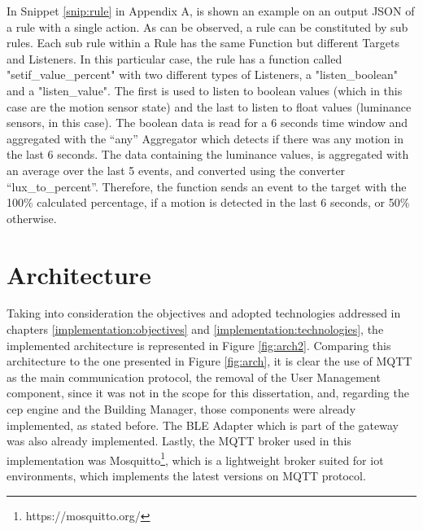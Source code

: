 In Snippet \ref{snip:rule} in Appendix A, is shown an example on an output JSON of a rule with a single action. As can be observed, a rule can be constituted by sub rules. Each sub rule within a Rule has the same Function but different Targets and Listeners. In this particular case, the rule has a function called "setif\_value\_percent" with two different types of Listeners, a "listen\_boolean" and a "listen\_value". The first is used to listen to boolean values (which in this case are the motion sensor state) and the last to listen to float values (luminance sensors, in this case). The boolean data is read for a 6 seconds time window and aggregated with the “any” Aggregator which detects if there was any motion in the last 6 seconds. The data containing the luminance values, is aggregated with an average over the last 5 events, and converted using the converter “lux\_to\_percent”. Therefore, the function sends an event to the target with the 100\% calculated percentage, if a motion is detected in the last 6 seconds, or 50\% otherwise. 





	
\section{Architecture}
\label{implementation:architecture}
Taking into consideration the objectives and adopted technologies addressed in chapters \ref{implementation:objectives} and \ref{implementation:technologies}, the implemented architecture is represented in Figure \ref{fig:arch2}. Comparing this architecture to the one presented in Figure \ref{fig:arch}, it is clear the use of MQTT as the main communication protocol, the removal of the User Management component, since it was not in the scope for this dissertation, and, regarding the \ac{cep} engine and the Building Manager, those components were already implemented, as stated before. The BLE Adapter which is part of the gateway was also already implemented. Lastly, the MQTT broker used in this implementation was Mosquitto\footnote{https://mosquitto.org/}, which is a lightweight broker suited for \ac{iot} environments, which implements the latest versions on MQTT protocol. 




